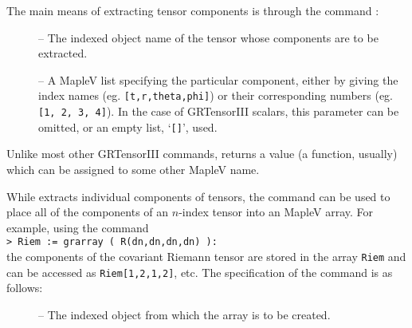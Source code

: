 \documentclass{article}
\begin{document}
{{{The main means of extracting tensor components is through the command
:\\
%
\begin{cmdspec}
  \label{spec:grcomponent}

  \begin{description}
    \item[] -- The indexed object name of the tensor whose
      components are to be extracted.
    \item[] -- A MapleV list specifying the particular
      component, either by giving the index names (eg. 
      \texttt{[t,r,theta,phi]}) or their corresponding 
      numbers (eg. \texttt{[1, 2, 3, 4]}).
      In the case of GRTensorIII scalars, this parameter can be omitted, or
      an empty list, `\texttt{[]}', used.
  \end{description}

\end{cmdspec}

Unlike most other GRTensorIII commands,  returns a
value (a function, usually) which can be assigned to some other MapleV name.

While  extracts individual components of tensors, the
command  can be used to place all of the components of
an $n$-index tensor into an MapleV array. For example, using the command\\

\noindent\texttt{> Riem := grarray ( R(dn,dn,dn,dn) ):}\\

\noindent the components of the covariant Riemann tensor are stored in
the array \texttt{Riem} and can be accessed as \texttt{Riem[1,2,1,2]}, etc.
The specification of the  command is as follows:
%
\begin{cmdspec}
  \label{spec:grarray}

  \begin{description}
    \item[] -- The indexed object from which the array is
      to be created.
  \end{description}

\end{cmdspec}

}}}
\end{document}
